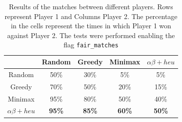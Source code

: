 \documentclass[11pt]{scrartcl}
\begin{document}
\begin{table}[tb]
\centering
\begin{tabular}{|c|c|c|c|c|}
\hline
 & Random & Greedy & Minimax & $\alpha\beta+heu$ \\ \hline
Random & 50\% & 30\% & 5\% & 5\% \\ \hline
Greedy & 70\% & 50\% & 20\% & 15\% \\ \hline
Minimax & 95\% & 80\% & 50\% & 40\% \\ \hline
$\alpha\beta + heu$ & \textbf{95\%} & \textbf{85\%} & \textbf{60\%} & \textbf{50\%} \\ \hline
\end{tabular}
\caption{\label{result}Results of the matches between different players. Rows represent Player 1 and Columns Player 2. The percentage in the cells represent the times in which Player 1 won against Player 2. The tests were performed enabling the flag \texttt{fair\_matches}}
\end{table}
\end{document}
